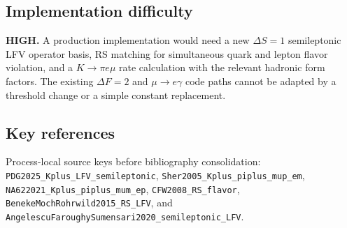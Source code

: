 \subsection*{Implementation difficulty}
\textbf{HIGH.}  A production implementation would need a new
\(\Delta S=1\) semileptonic LFV operator basis, RS matching for simultaneous
quark and lepton flavor violation, and a \(K\to\pi e\mu\) rate calculation with
the relevant hadronic form factors.  The existing \(\Delta F=2\) and
\(\mu\to e\gamma\) code paths cannot be adapted by a threshold change or a
simple constant replacement.

\subsection*{Key references}
Process-local source keys before bibliography consolidation:
\texttt{PDG2025\_Kplus\_LFV\_semileptonic},
\texttt{Sher2005\_Kplus\_piplus\_mup\_em},
\texttt{NA622021\_Kplus\_piplus\_mum\_ep},
\texttt{CFW2008\_RS\_flavor},
\texttt{BenekeMochRohrwild2015\_RS\_LFV}, and
\texttt{AngelescuFaroughySumensari2020\_semileptonic\_LFV}.

